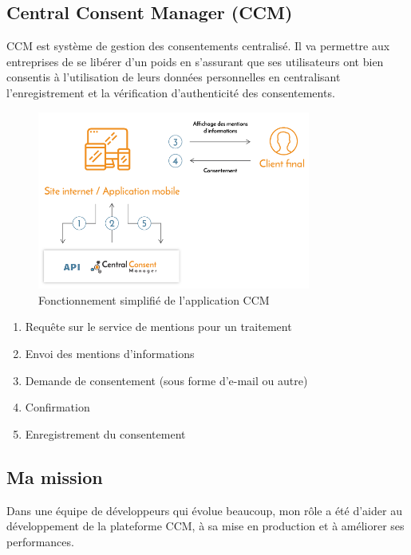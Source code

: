 \documentclass[12pt, a4paper]{report}
\newcommand\tab[1][1cm]{\hspace*{#1}}
\begin{document}
        \subsection{Central Consent Manager (CCM)}
            \tab{} CCM est système de gestion des consentements centralisé. Il va permettre aux entreprises de se libérer d'un poids en s'assurant que ses utilisateurs ont bien consentis à l'utilisation de leurs données personnelles en centralisant l'enregistrement et la vérification d'authenticité des consentements.
            \begin{figure}[H]
                \begin{center}
                    \includegraphics[width=0.8\textwidth]{ccm.png}
                \end{center}
                \caption{Fonctionnement simplifié de l'application CCM}
            \end{figure}
            \begin{enumerate}
                \item Requête sur le service de mentions pour un traitement
                \item Envoi des mentions d'informations
                \item Demande de consentement (sous forme d'e-mail ou autre)
                \item Confirmation
                \item Enregistrement du consentement
            \end{enumerate}
        \subsection{Ma mission}
            \tab{} Dans une équipe de développeurs qui évolue beaucoup, mon rôle a été d'aider au développement de la plateforme CCM, à sa mise en production et à améliorer ses performances.
\end{document}
